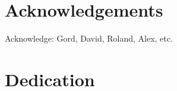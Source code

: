 


\tableofcontents                %
\listoffigures                  %

\chapter{Acknowledgements}      %
Acknowledge: Gord, David, Roland, Alex, etc.

\chapter{Dedication} %

